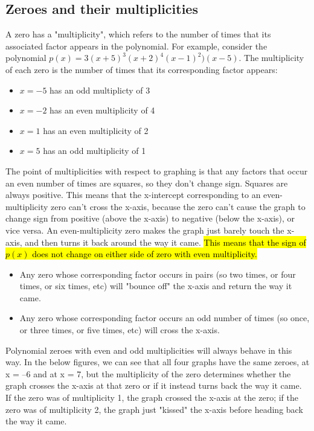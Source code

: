 \documentclass{book}
\begin{document}
	\subsection{Zeroes and their multiplicities}
	A zero has a "multiplicity", which refers to the number of times that its associated factor appears in the polynomial. For example, consider the polynomial $p(x) = 3(x+5)^3(x+2)^4(x-1)^2)(x-5)$. The multiplicity of each zero is the number of times that its corresponding factor appears:
	
	\begin{itemize}
		\item $x=-5$ has an odd multiplicty of 3
		\item $x=-2$ has an even multiplicity of 4
		\item $x=1$ has an even multiplicity of 2
		\item $x=5$ has an odd multiplicity of 1
	\end{itemize}
	
	The point of multiplicities with respect to graphing is that any factors that occur an even number of times are squares, so they don't change sign. Squares are always positive. This means that the x-intercept corresponding to an even-multiplicity zero can't cross the x-axis, because the zero can't cause the graph to change sign from positive (above the x-axis) to negative (below the x-axis), or vice versa.  An even-multiplicity zero makes the graph just barely touch the x-axis, and then turns it back around the way it came. \hl{This means that the sign of $p(x)$ does not change on either side of zero with even multiplicity.}
	
	\begin{itemize}
		\item Any zero whose corresponding factor occurs in pairs (so two times, or four times, or six times, etc) will "bounce off" the x-axis and return the way it came. \item Any zero whose corresponding factor occurs an odd number of times (so once, or three times, or five times, etc) will cross the x-axis. 
	\end{itemize}
	
	Polynomial zeroes with even and odd multiplicities will always behave in this way. In the below figures, we can see that all  four graphs have the same zeroes, at x = –6 and at x = 7, but the multiplicity of the zero determines whether the graph crosses the x-axis at that zero or if it instead turns back the way it came. If the zero was of multiplicity 1, the graph crossed the x-axis at the zero; if the zero was of multiplicity 2, the graph just "kissed" the x-axis before heading back the way it came.
	
\end{document}
